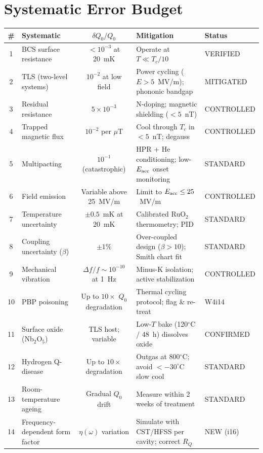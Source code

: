 \documentclass[11pt]{article}
\newcommand{\ee}[1]{\times 10^{#1}}
\begin{document}
\section{Systematic Error Budget}

\begin{center}
\renewcommand{\arraystretch}{1.2}
\begin{longtable}{@{}clcll@{}}
\toprule
\textbf{\#} & \textbf{Systematic} & \textbf{$\delta Q_0/Q_0$} &
  \textbf{Mitigation} & \textbf{Status} \\
\midrule
\endhead
1 & BCS surface resistance & $< 10^{-3}$ at 20~mK & Operate at
  $T \ll T_c/10$ & VERIFIED \\
2 & TLS (two-level systems) & $10^{-2}$ at low field & Power cycling
  ($E > 5$~MV/m); phononic bandgap & MITIGATED \\
3 & Residual resistance & $5\ee{-3}$ & N-doping; magnetic shielding
  ($< 5$~nT) & CONTROLLED \\
4 & Trapped magnetic flux & $10^{-2}$ per $\mu$T & Cool through $T_c$
  in $< 5$~nT; degauss & CONTROLLED \\
5 & Multipacting & $10^{-1}$ (catastrophic) & HPR + He conditioning;
  low-$E_{\rm acc}$ onset monitoring & STANDARD \\
6 & Field emission & Variable above 25~MV/m & Limit to
  $E_{\rm acc} \leq 25$~MV/m & CONTROLLED \\
7 & Temperature uncertainty & $\pm 0.5$~mK at 20~mK & Calibrated
  RuO$_2$ thermometry; PID & STANDARD \\
8 & Coupling uncertainty ($\beta$) & $\pm 1\%$ & Over-coupled design
  ($\beta > 10$); Smith chart fit & STANDARD \\
9 & Mechanical vibration & $\Delta f/f \sim 10^{-10}$ at 1~Hz & Minus-K
  isolation; active stabilization & CONTROLLED \\
10 & PBP poisoning & Up to $10\times$ $Q_0$ degradation & Thermal
  cycling protocol; flag \& re-treat & W4i14 \\
11 & Surface oxide (Nb$_2$O$_5$) & TLS host; variable & Low-$T$ bake
  (120$^\circ$C / 48~h) dissolves oxide & CONFIRMED \\
12 & Hydrogen Q-disease & Up to $10\times$ degradation & Outgas at
  800$^\circ$C; avoid $< -30^\circ$C slow cool & STANDARD \\
13 & Room-temperature ageing & Gradual $Q_0$ drift & Measure within 2
  weeks of treatment & STANDARD \\
14 & Frequency-dependent form factor & $\eta(\omega)$ variation &
  Simulate with CST/HFSS per cavity;
  correct $R_Q$ & NEW (i16) \\
\bottomrule
\end{longtable}
\end{center}
\end{document}
